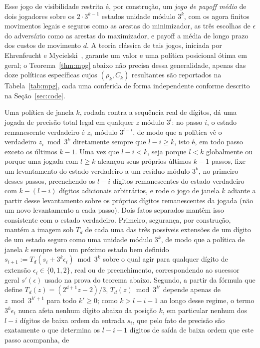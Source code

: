 \documentclass[11pt]{amsart}
\theoremstyle{plain}
\theoremstyle{definition}
\theoremstyle{remark}
\begin{document}
Esse jogo de visibilidade restrita é, por construção, um \emph{jogo de payoff médio} de dois
jogadores sobre os $2\cdot3^{k-1}$ estados unidade módulo $3^k$, com os agora finitos movimentos
legais e seguros como as arestas do minimizador, as três escolhas de $\epsilon$ do adversário como
as arestas do maximizador, e payoff a média de longo prazo dos custos de movimento $d$. A teoria
clássica de tais jogos, iniciada por Ehrenfeucht e Mycielski~\cite{ehrenfeuchtmycielski1979},
garante um valor e uma política posicional ótima em geral; o Teorema~\ref{thm:mpg} abaixo não
precisa dessa generalidade, apenas das doze políticas específicas cujos $(\rho_k,C_k)$ resultantes
são reportados na Tabela~\ref{tab:mpg}, cada uma conferida de forma independente conforme descrito
na Seção~\ref{sec:code}.

Uma política de janela $k$, rodada contra a sequência real de dígitos, dá uma jogada de precisão
total legal em qualquer $z$ módulo $3^l$: no passo $i$, o estado remanescente verdadeiro é $z_i$
módulo $3^{l-i}$, de modo que a política vê o verdadeiro $z_i\bmod3^k$ diretamente sempre que
$l-i\ge k$, isto é, em todo passo exceto os últimos $k-1$. Uma vez que $l-i<k$, seja porque $l<k$
globalmente ou porque uma jogada com $l\ge k$ alcançou seus próprios últimos $k-1$ passos, fixe um
levantamento do estado verdadeiro a um resíduo módulo $3^k$, no primeiro desses passos, preenchendo
os $l-i$ dígitos remanescentes do estado verdadeiro com $k-(l-i)$ dígitos adicionais arbitrários, e
rode o jogo de janela $k$ adiante a partir desse levantamento sobre os próprios dígitos
remanescentes da jogada (não um novo levantamento a cada passo). Dois fatos separados mantêm isso
consistente com o estado verdadeiro. Primeiro, segurança, por construção, mantém a imagem sob
$T_d$ de cada uma das três possíveis extensões de um dígito de um estado seguro como uma unidade
módulo $3^k$, de modo que a política de janela $k$ sempre tem um próximo estado bem definido
$s_{i+1}:=T_d(s_i+3^k\epsilon_i)\bmod3^k$ sobre o qual agir para qualquer dígito de extensão
$\epsilon_i\in\{0,1,2\}$, real ou de preenchimento, correspondendo ao sucessor geral $s'(\epsilon)$
usado na prova do teorema abaixo. Segundo, a partir da fórmula que define $T_d(z)=(2^{d+1}z-2)/3$,
$T_d(z)\bmod3^{k'}$ depende apenas de $z\bmod3^{k'+1}$ para todo $k'\ge0$; como $k>l-i-1$ ao longo
desse regime, o termo $3^k\epsilon_i$ nunca afeta nenhum dígito abaixo da posição $k$, em
particular nenhum dos $l-i$ dígitos de baixa ordem da entrada $s_i$, que pelo fato de precisão são
exatamente o que determina os $l-i-1$ dígitos de saída de baixa ordem que este passo acompanha, de
\end{document}
